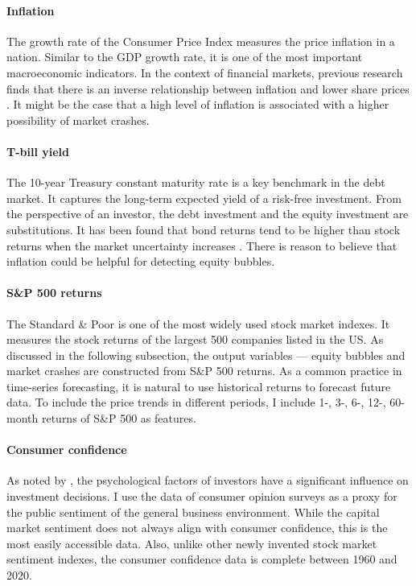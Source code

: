 \documentclass[12pt, man, a4paper, floatsintext]{apa7}
\begin{document}
\paragraph{Inflation} The growth rate of the Consumer Price Index measures the price inflation in a nation. Similar to the GDP growth rate, it is one of the most important macroeconomic indicators. In the context of financial markets, previous research finds that there is an inverse relationship between inflation and lower share prices \parencite{inflation}. It might be the case that a high level of inflation is associated with a higher possibility of market crashes.

\paragraph{T-bill yield} The 10-year Treasury constant maturity rate is a key benchmark in the debt market. It captures the long-term expected yield of a risk-free investment. From the perspective of an investor, the debt investment and the equity investment are substitutions. It has been found that bond returns tend to be higher than stock returns when the market uncertainty increases \parencite{bond}. There is reason to believe that inflation could be helpful for detecting equity bubbles. 

\paragraph{S\&P 500 returns} The Standard \& Poor is one of the most widely used stock market indexes. It measures the stock returns of the largest 500 companies listed in the US. As discussed in the following subsection, the output variables — equity bubbles and market crashes are constructed from S\&P 500 returns. As a common practice in time-series forecasting, it is natural to use historical returns to forecast future data. To include the price trends in different periods, I include 1-, 3-, 6-, 12-, 60-month returns of S\&P 500 as features.

\paragraph{Consumer confidence} As noted by \textcite{psychology}, the psychological factors of investors have a significant influence on investment decisions. I use the data of consumer opinion surveys as a proxy for the public sentiment of the general business environment. While the capital market sentiment does not always align with consumer confidence, this is the most easily accessible data. Also, unlike other newly invented stock market sentiment indexes,  the consumer confidence data is complete between 1960 and 2020.
\end{document}

